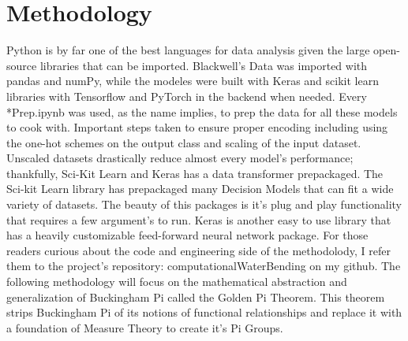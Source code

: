 \documentclass{article}
\theoremstyle{definition}
\begin{document}













\section{Methodology}



Python is by far one of the best languages for data analysis given the large open-source libraries that can be imported.  Blackwell's Data was imported with pandas and numPy, while the modeles were built with Keras and scikit learn libraries with Tensorflow and PyTorch in the backend when needed.  Every *Prep.ipynb was used, as the name implies, to prep the data for all these models to cook with.  Important steps taken to ensure proper encoding including using the one-hot schemes on the output class and scaling of the input dataset.  Unscaled datasets drastically reduce almost every model's performance; thankfully, Sci-Kit Learn and Keras has a data transformer prepackaged.  The Sci-kit Learn library has prepackaged many Decision Models that can fit a wide variety of datasets. The beauty of this packages is it's plug and play functionality that requires a few argument's to run.  Keras is another easy to use library that has a heavily customizable feed-forward neural network package. For those readers curious about the code and engineering side of the methodolody, I refer them to the project's repository: computationalWaterBending on my github.  The following methodology will focus on the mathematical abstraction and generalization of Buckingham Pi called the Golden Pi Theorem.  This theorem strips Buckingham Pi of its notions of functional relationships and replace it with a foundation of Measure Theory to create it's Pi Groups.
\end{document}
